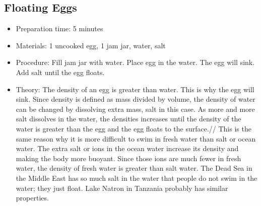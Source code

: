 \subsection{Floating Eggs}
\begin{itemize}
\item{Preparation time: 5 minutes}
\item{Materials: 1 uncooked egg, 1 jam jar, water, salt}
\item{Procedure: Fill jam jar with water. Place egg in the water. The egg will sink. Add salt until the egg floats. }
\item{Theory: The density of an egg is greater than water. This is why the egg will sink. Since density is defined as mass divided by volume, the density of water can be changed by dissolving extra mass, salt in this case. As more and more salt dissolves in the water, the densities increases until the density of the water is greater than the egg and the egg floats to the surface.//
This is the same reason why it is more difficult to swim in fresh water than salt or ocean water. The extra salt or ions in the ocean water increase its density and making the body more buoyant. Since those ions are much fewer in fresh water, the density of fresh water is greater than salt water. The Dead Sea in the Middle East has so much salt in the water that people do not swim in the water; they just float. Lake Natron in Tanzania probably has similar properties.}
\end{itemize}

